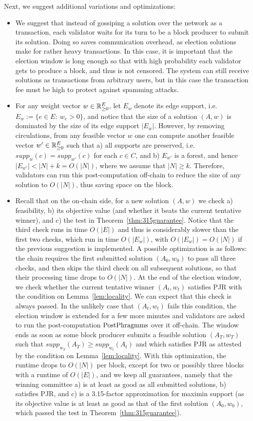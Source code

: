 Next, we suggest additional variations and optimizations:
\begin{itemize}
\item We suggest that instead of gossiping a solution over the network as a transaction, each validator waits for its turn to be a block producer to submit its solution. Doing so saves communication overhead, as election solutions make for rather heavy transactions. In this case, it is important that the election window is long enough so that with high probability each validator gets to produce a block, and thus is not censored. 
The system can still receive solutions as transactions from arbitrary users, but in this case the transaction fee must be high to protect against spamming attacks. 
\item For any weight vector $w\in \mathbb{R}_{\geq 0}^E$, let $E_w$ denote its edge support, i.e. $E_w:=\{e\in E: \ w_e>0\}$, and notice that the size of a solution $(A,w)$ is dominated by the size of its edge support $|E_w|$. 
However, by removing circulations, from any feasible vector $w$ one can compute another feasible vector $w'\in\mathbb{R}_{\geq 0}^E$ such that a) all supports are preserved, i.e. $supp_w(c)=supp_{w'}(c)$ for each $c\in C$, and b) $E_{w'}$ is a forest, and hence $|E_{w'}|< |N|+k=O(|N|)$, where we assume that $|N|\geq k$. Therefore, validators can run this post-computation off-chain to reduce the size of any solution to $O(|N|)$, thus saving space on the block.

\item Recall that on the on-chain side, for a new solution $(A,w)$ we check a) feasibility, b) its objective value (and whether it beats the current tentative winner), and c) the test in Theorem~\ref{thm:315guarantee}. Notice that the third check runs in time $O(|E|)$ and thus is considerably slower than the first two checks, which run in time $O(|E_w|)$, with $O(|E_w|)=O(|N|)$ if the previous suggestion is implemented. 
A possible optimization is as follows: the chain requires the first submitted solution $(A_0, w_0)$ to pass all three checks, and then skips the third check on all subsequent solutions, so that their processing time drops to $O(|N|)$. At the end of the election window, we check whether the current tentative winner $(A_t, w_t)$ satisfies PJR with the condition on Lemma~\ref{lem:locality}. 
We can expect that this check is always passed. In the unlikely case that $(A_t, w_t)$ fails this condition, the election window is extended for a few more minutes and validators are asked to run the post-computation $\operatorname{PostPhragmms}$ over it off-chain. 
The window ends as soon as some block producer submits a feasible solution $(A_T, w_T)$ such that $supp_{w_T}(A_T)\geq supp_{w_t}(A_t)$ and which satisfies PJR as attested by the condition on Lemma~\ref{lem:locality}. 
With this optimization, the runtime drops to $O(|N|)$ per block, except for two or possibly three blocks with a runtime of $O(|E|)$, and we keep all guarantees, namely that the winning committee a) is at least as good as all submitted solutions, b) satisfies PJR, and c) is a 3.15-factor approximation for maximin support (as its objective value is at least as good as that of the first solution $(A_0, w_0)$, which passed the test in Theorem~\ref{thm:315guarantee}). 


\end{itemize}
